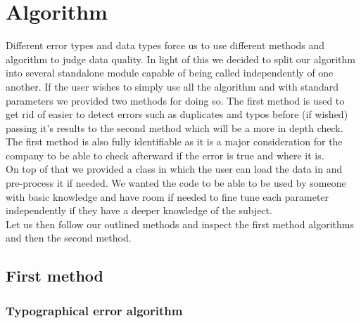 \documentclass{article}
\begin{document}

\section{Algorithm} %
\label{sec:Algorithm}
Different error types and data types force us to use different methods and algorithm to judge data quality. In light of this we decided to split our algorithm into several standalone module capable of being called independently of one another.
If the user wishes to simply use all the algorithm and with standard parameters we provided two methods for doing so. The first method is used to get rid of easier to detect errors such as duplicates and typos before (if wished) passing it's results to the second method which will be a more in depth check. The first method is also fully identifiable as it is a major consideration for the company to be able to check afterward if the error is true and where it is.\\
On top of that we provided a class in which the user can load the data in and pre-process it if needed. We wanted the code to be able to be used by someone with basic knowledge and have room if needed to fine tune each parameter independently if they have a deeper knowledge of the subject.\\
Let us then follow our outlined methods and inspect the first method algorithms and then the second method.


\subsection{First method}

\subsubsection{Typographical error algorithm}
\end{document}
